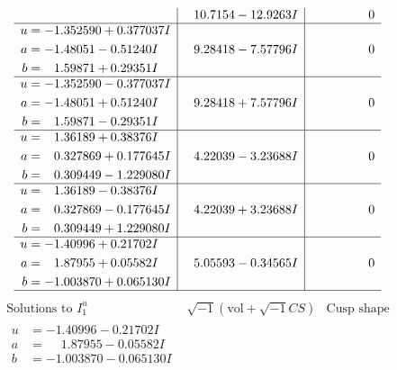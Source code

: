 \documentclass[1p]{elsarticle_modified}
\theoremstyle{definition}
\newcommand{\I}{\sqrt{-1}}
\begin{document}
$$\begin{array}{c|c|c}
 & \phantom{-}10.7154 - 12.9263 I & \phantom{-0.000000 } 0 \\ \hline\begin{aligned}
u &= -1.352590 + 0.377037 I \\
a &= -1.48051 - 0.51240 I \\
b &= \phantom{-}1.59871 + 0.29351 I\end{aligned}
 & \phantom{-}9.28418 - 7.57796 I & \phantom{-0.000000 } 0 \\ \hline\begin{aligned}
u &= -1.352590 - 0.377037 I \\
a &= -1.48051 + 0.51240 I \\
b &= \phantom{-}1.59871 - 0.29351 I\end{aligned}
 & \phantom{-}9.28418 + 7.57796 I & \phantom{-0.000000 } 0 \\ \hline\begin{aligned}
u &= \phantom{-}1.36189 + 0.38376 I \\
a &= \phantom{-}0.327869 + 0.177645 I \\
b &= \phantom{-}0.309449 - 1.229080 I\end{aligned}
 & \phantom{-}4.22039 - 3.23688 I & \phantom{-0.000000 } 0 \\ \hline\begin{aligned}
u &= \phantom{-}1.36189 - 0.38376 I \\
a &= \phantom{-}0.327869 - 0.177645 I \\
b &= \phantom{-}0.309449 + 1.229080 I\end{aligned}
 & \phantom{-}4.22039 + 3.23688 I & \phantom{-0.000000 } 0 \\ \hline\begin{aligned}
u &= -1.40996 + 0.21702 I \\
a &= \phantom{-}1.87955 + 0.05582 I \\
b &= -1.003870 + 0.065130 I\end{aligned}
 & \phantom{-}5.05593 - 0.34565 I & \phantom{-0.000000 } 0\\
 \hline 
 \end{array}$$\newpage$$\begin{array}{c|c|c}  
\text{Solutions to }I^u_{1}& \I (\text{vol} + \sqrt{-1}CS) & \text{Cusp shape}\\
 \hline 
\begin{aligned}
u &= -1.40996 - 0.21702 I \\
a &= \phantom{-}1.87955 - 0.05582 I \\
b &= -1.003870 - 0.065130 I\end{aligned}

\end{array}$$
\end{document}
